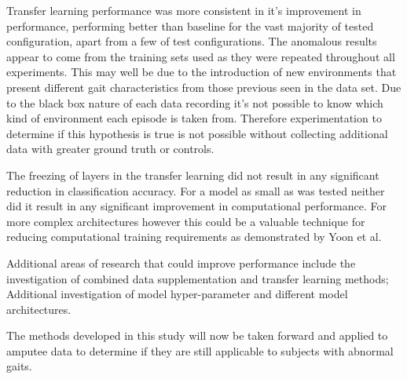 Transfer learning performance was more consistent in it's improvement in performance, performing better than baseline for the vast majority of tested configuration, apart from a few of test configurations. The anomalous results appear to come from the training sets used as they were repeated throughout all experiments. This may well be due to the introduction of new environments that present different gait characteristics from those previous seen in the data set. Due to the black box nature of each data recording it's not possible to know which kind of environment each episode is taken from. Therefore experimentation to determine if this hypothesis is true is not possible without collecting additional data with greater ground truth or controls.

The freezing of layers in the transfer learning did not result in any significant reduction in classification accuracy. For a model as small as was tested neither did it result in any significant improvement in computational performance. For more complex architectures however this could be a valuable technique for reducing computational training requirements as demonstrated by Yoon et al\cite{Yoon2017}.

Additional areas of research that could improve performance include the investigation of combined data supplementation and transfer learning methods; Additional investigation of model hyper-parameter and different model architectures.

The methods developed in this study will now be taken forward and applied to amputee data to determine if they are still applicable to subjects with abnormal gaits.
